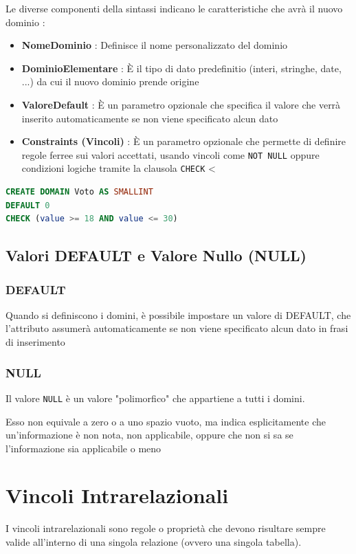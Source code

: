 Le diverse componenti della sintassi indicano le caratteristiche che avrà il nuovo dominio :

\begin{itemize}
    \item \textbf{NomeDominio} : Definisce il nome personalizzato del dominio
    \item \textbf{DominioElementare} : È il tipo di dato predefinitio (interi, stringhe, date, ...) da cui il nuovo dominio prende origine
    \item \textbf{ValoreDefault} : È un parametro opzionale che specifica il valore che verrà inserito automaticamente se non viene specificato alcun dato
    \item \textbf{Constraints (Vincoli)} : È un parametro opzionale che permette di definire regole ferree sui valori accettati, usando vincoli come \texttt{NOT NULL} oppure condizioni logiche tramite la clausola \texttt{CHECK}
<\end{itemize}

\begin{lstlisting}[language=SQL, caption={Creazione del dominio "Voto"}]
CREATE DOMAIN Voto AS SMALLINT
DEFAULT 0
CHECK (value >= 18 AND value <= 30)
\end{lstlisting}

\subsection{Valori DEFAULT e Valore Nullo (NULL)}
\subsubsection{DEFAULT}
Quando si definiscono i domini, è possibile impostare un valore di DEFAULT, che l'attributo assumerà automaticamente se non viene specificato alcun dato in frasi di inserimento
\subsubsection{NULL}
Il valore \texttt{NULL} è un valore "polimorfico" che appartiene a tutti i domini.

Esso non equivale a zero o a uno spazio vuoto, ma indica esplicitamente che un'informazione è non nota, non applicabile, oppure che non si sa se l'informazione sia applicabile o meno

\section{Vincoli Intrarelazionali}
I vincoli intrarelazionali sono regole o proprietà che devono risultare sempre valide all'interno di una singola relazione (ovvero una singola tabella).

